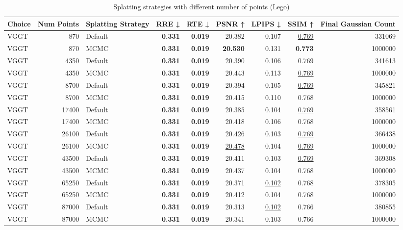 \begin{table}[H]
\caption{Splatting strategies with different number of points (Lego)}
\label{tab:09_splatting_strategy_points_lego}
\begin{tabular}{lrlrrrrrr}
\toprule
Choice & Num Points & Splatting Strategy & RRE ↓ & RTE ↓ & PSNR ↑ & LPIPS ↓ & SSIM ↑ & Final Gaussian Count \\
\midrule
VGGT & 870 & Default & \textbf{0.331} & \textbf{0.019} & 20.382 & 0.107 & \underline{0.769} & 331069 \\
VGGT & 870 & MCMC & \textbf{0.331} & \textbf{0.019} & \textbf{20.530} & 0.131 & \textbf{0.773} & 1000000 \\
VGGT & 4350 & Default & \textbf{0.331} & \textbf{0.019} & 20.390 & 0.106 & \underline{0.769} & 341613 \\
VGGT & 4350 & MCMC & \textbf{0.331} & \textbf{0.019} & 20.443 & 0.113 & \underline{0.769} & 1000000 \\
VGGT & 8700 & Default & \textbf{0.331} & \textbf{0.019} & 20.394 & 0.105 & \underline{0.769} & 345821 \\
VGGT & 8700 & MCMC & \textbf{0.331} & \textbf{0.019} & 20.415 & 0.110 & 0.768 & 1000000 \\
VGGT & 17400 & Default & \textbf{0.331} & \textbf{0.019} & 20.385 & 0.104 & \underline{0.769} & 358561 \\
VGGT & 17400 & MCMC & \textbf{0.331} & \textbf{0.019} & 20.418 & 0.106 & 0.768 & 1000000 \\
VGGT & 26100 & Default & \textbf{0.331} & \textbf{0.019} & 20.426 & 0.103 & \underline{0.769} & 366438 \\
VGGT & 26100 & MCMC & \textbf{0.331} & \textbf{0.019} & \underline{20.478} & 0.104 & \underline{0.769} & 1000000 \\
VGGT & 43500 & Default & \textbf{0.331} & \textbf{0.019} & 20.411 & 0.103 & \underline{0.769} & 369308 \\
VGGT & 43500 & MCMC & \textbf{0.331} & \textbf{0.019} & 20.437 & 0.104 & 0.768 & 1000000 \\
VGGT & 65250 & Default & \textbf{0.331} & \textbf{0.019} & 20.371 & \underline{0.102} & 0.768 & 378305 \\
VGGT & 65250 & MCMC & \textbf{0.331} & \textbf{0.019} & 20.412 & 0.104 & 0.768 & 1000000 \\
VGGT & 87000 & Default & \textbf{0.331} & \textbf{0.019} & 20.313 & \underline{0.102} & 0.766 & 380855 \\
VGGT & 87000 & MCMC & \textbf{0.331} & \textbf{0.019} & 20.341 & 0.103 & 0.766 & 1000000 \\

\end{tabular}
\end{table}
